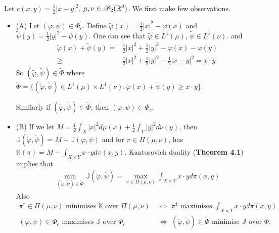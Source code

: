 \documentclass[10pt,a4paper]{article}
\renewenvironment{i}
{\begin{itemize} 
	}%
	{\end{itemize}
}
\begin{document}
Let $c(x,y) = \frac{1}{2} |x-y|^2$, $\mu, \nu \in \mathscr{P}_2 (\mathbb{R}^d)$. We first make few observations. 
\begin{i}
\item[(A)] Let $(\varphi, \psi) \in \Phi_c$. Define $\tilde{\varphi}(x) = \frac{1}{2} |x|^2 - \varphi(x)$ and $\tilde{\psi}(y) = \frac{1}{2} |y|^2 - \psi(y)$. One can see that $\tilde{\varphi} \in L^1(\mu)$, $\tilde{\psi} \in L^1(\nu)$. and 
\begin{align*}
\tilde{\varphi}(x) + \tilde{\psi}(y) =& \frac{1}{2} |x|^2 + \frac{1}{2} |y|^2 - \varphi(x) - \varphi(y) \\
\geq & \frac{1}{2} |x|^2 + \frac{1}{2} |y|^2 - \frac{1}{2} |x-y|^2 = x\cdot y
\end{align*}
So $(\tilde{\varphi}, \tilde{\psi}) \in \tilde{\Phi}$ where $\tilde{\Phi} = \{(\tilde{\varphi}, \tilde{\psi}) \in L^1(\mu) \times L^1(\nu) : \tilde{\varphi}(x) + \tilde{\psi}(y) \geq x\cdot y\}$.

\quad Similarly if $(\tilde{\varphi}, \tilde{\psi}) \in \tilde{\Phi}$, then $(\varphi, \psi) \in \Phi_c$.

\item[(B)] If we let $M = \frac{1}{2}\int_X |x|^2 d\mu(x) + \frac{1}{2} \int_Y |y|^2 d\nu(y)$, then $\mathbb{J}(\tilde{\varphi}, \tilde{\psi}) = M - \mathbb{J}(\varphi, \psi)$ and for $\pi \in \Pi(\mu, \nu)$, has $\mathbb{K}(\pi) = M - \int_{X\times Y} x\cdot y d\pi(x,y)$. Kantorovich duality (\textbf{Theorem 4.1}) implies that
\begin{align*}
\min_{(\tilde{\varphi}, \tilde{\psi}) \in \tilde{\Phi}} \mathbb{J}(\tilde{\varphi}, \tilde{\psi})  = \max_{\pi \in \Pi(\mu, \nu)} \int_{X\times Y} x\cdot y d\pi(x,y)
\end{align*}
Also 
\begin{align*}
\pi^{\dagger} \in \Pi(\mu, \nu)\text{ minimises }\mathbb{K}\text{ over }\Pi(\mu, \nu) \,\, &\Leftrightarrow \,\, \pi^{\dagger}\text{ maximises }\int_{X\times Y} x\cdot y d\pi(x,y) \\
(\varphi, \psi) \in \Phi_c\text{ maximises }\mathbb{J}\text{ over }\Phi_c \,\, & \Leftrightarrow \,\,(\tilde{\varphi}, \tilde{\psi}) \in \tilde{\Phi}\text{ minimise }\mathbb{J}\text{ over }\tilde{\Phi}.
\end{align*}


\end{i}
\end{document}
